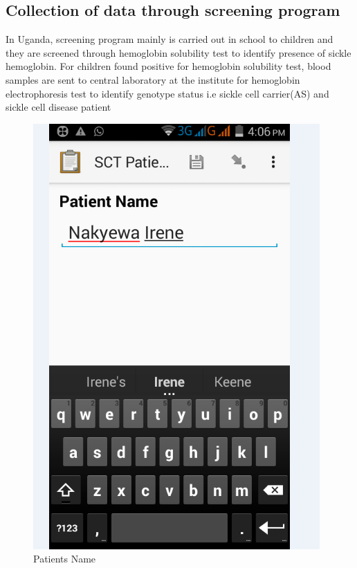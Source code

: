 \documentclass[12pt,]{article}
\begin{document}
\subsection{Collection of data through screening program}
In Uganda, screening program mainly is carried out in school to children and they are screened through hemoglobin solubility test to identify presence of sickle hemoglobin. For children found positive for hemoglobin solubility test, blood samples are sent to central laboratory at the institute for hemoglobin electrophoresis test to identify genotype status i.e sickle cell carrier(AS) and sickle cell disease patient 
\begin{figure}
\includegraphics[width=\linewidth]{form 1.png}
\caption{Patients Name}
\end{figure}
\end{document}
